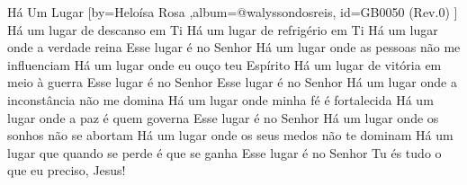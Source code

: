 \beginsong
{Há Um Lugar %
}[by={Heloísa Rosa %
},album={@walyssondosreis},
id={GB0050 %
(Rev.0) %
}]
\beginverse*
Há um lugar de descanso em Ti
Há um lugar de refrigério em Ti
Há um lugar onde a verdade reina
Esse lugar é no Senhor
\endverse
\beginverse*
Há um lugar onde as pessoas não me influenciam
Há um lugar onde eu ouço teu Espírito
Há um lugar de vitória em meio à guerra
Esse lugar é no Senhor
\endverse
\beginchorus
Esse lugar é no Senhor
\endchorus
\beginverse*
Há um lugar onde a inconstância não me domina
Há um lugar onde minha fé é fortalecida
Há um lugar onde a paz é quem governa
Esse lugar é no Senhor
\endverse
\beginverse*
Há um lugar onde os sonhos não se abortam
Há um lugar onde os seus medos não te dominam
Há um lugar que quando se perde é que se ganha
Esse lugar é no Senhor
\endverse
\beginverse*
Tu és tudo o que eu preciso, Jesus!
\endverse


